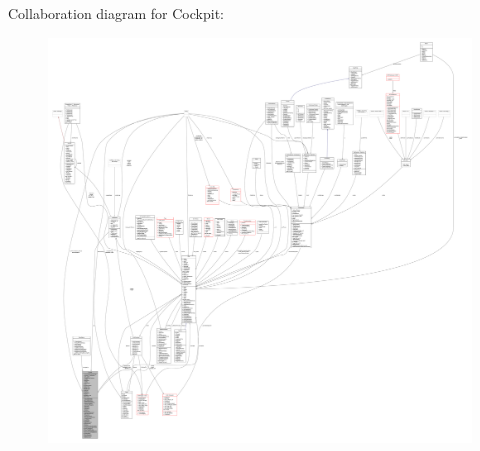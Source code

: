 Collaboration diagram for Cockpit\+:
\nopagebreak
\begin{figure}[H]
\begin{center}
\leavevmode
\includegraphics[width=350pt]{d6/d76/classCockpit__coll__graph}
\end{center}
\end{figure}
